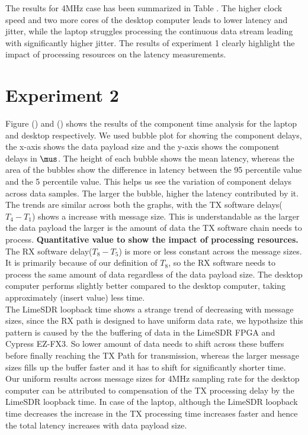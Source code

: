 The results for 4MHz case has been summarized in Table .
The higher clock speed and two more cores of the desktop computer leads to lower latency and jitter, while the laptop struggles processing the continuous data stream leading with significantly higher jitter.
The results of experiment 1 clearly highlight the impact of processing resources on the latency measurements.

\section{Experiment 2}

Figure () and () shows the results of the component time analysis for the laptop and desktop respectively.
We used bubble plot for showing the component delays, the x-axis shows the data payload size and the y-axis shows the component delays in $\mus$.
The height of each bubble shows the mean latency, whereas the area of the bubbles show the difference in latency between the 95 percentile value and the 5 percentile value.
This helps us see the variation of component delays across data samples.
The larger the bubble, higher the latency contributed by it.\\

The trends are similar across both the graphs, with the TX software delays($T_4 - T_1$) shows a increase with message size.
This is understandable as the larger the data payload the larger is the amount of data the TX software chain needs to process.
\textbf{Quantitative value to show the impact of processing resources.}
The RX software delay($T_8 - T_5$) is more or less constant across the message sizes.
It is primarily because of our definition of $T_8$, so the RX software needs to process the same amount of data regardless of the data payload size.
The desktop computer performs slightly better compared to the desktop computer, taking approximately (insert value) less time.\\

The LimeSDR loopback time shows a strange trend of decreasing with message sizes, since the RX path is designed to have uniform data rate, we hypothsize this pattern is caused by the the buffering of data in the LimeSDR \ac{FPGA} and Cypress EZ-FX3.
So lower amount of data needs to shift across these buffers before finally reaching the TX Path for transmission, whereas the larger message sizes fills up the buffer faster and it has to shift for significantly shorter time.\\
Our uniform results across message sizes for 4MHz sampling rate for the desktop computer can be attributed to compensation of the TX processing delay by the LimeSDR loopback time.
In case of the laptop, although the LimeSDR loopback time decreases the increase in the TX processing time increases faster and hence the total latency increases with data payload size.